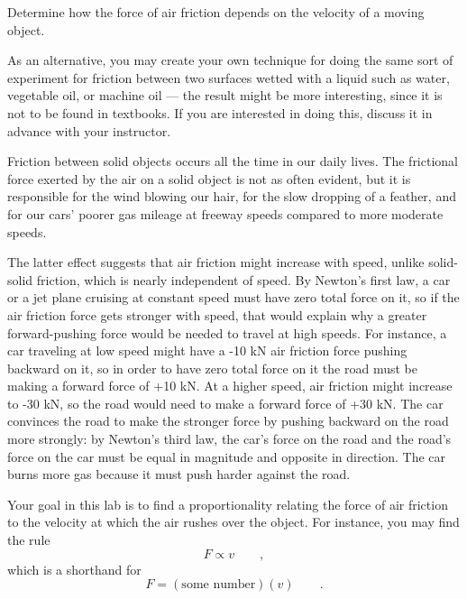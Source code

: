 \label{lab:air-friction}

\apparatus
{}

\goal

Determine how the force of air friction depends on the
velocity of a moving object.

As an alternative, you may create your own technique for
doing the same sort of experiment for friction between two
surfaces wetted with a liquid such as water, vegetable oil,
or machine oil --- the result might be more interesting,
since it is not to be found in textbooks. If you are
interested in doing this, discuss it in advance with your instructor.

\introduction

Friction between solid objects occurs all the time in our
daily lives. The frictional force exerted by the air on a
solid object is not as often evident, but it is responsible
for the wind blowing our hair, for the slow dropping of a
feather, and for our cars' poorer gas mileage at freeway
speeds compared to more moderate speeds.

The latter effect suggests that air friction might increase
with speed, unlike solid-solid friction, which is nearly
independent of speed. By Newton's first law, a car or a jet
plane cruising at constant speed must have zero total force
on it, so if the air friction force gets stronger with
speed, that would explain why a greater forward-pushing
force would be needed to travel at high speeds. For
instance, a car traveling at low speed might have a -10 kN
air friction force pushing backward on it, so in order to
have zero total force on it the road must be making a
forward force of +10 kN. At a higher speed, air friction
might increase to -30 kN, so the road would need to make a
forward force of +30 kN. The car convinces the road to make
the stronger force by pushing  backward on the road more
strongly: by Newton's third law, the car's force on the road
and the road's force on the car must be equal in magnitude
and opposite in direction. The car burns more gas because it
must push harder against the road.

Your goal in this lab is to find a proportionality relating
the force of air friction to the velocity at which the air
rushes over the object. For instance, you may find the rule
\begin{equation*}
	F\propto v   \qquad ,
\end{equation*}
which is a shorthand for
\begin{equation*}
	F  = (\text{some number})(v)   \qquad   .
\end{equation*}

